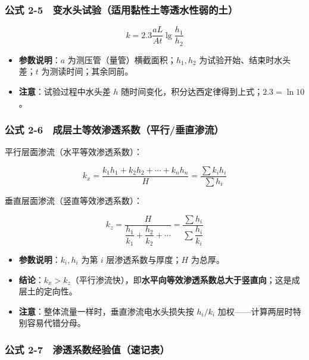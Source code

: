 \documentclass[
]{article}
\providecommand{\tightlist}{%
  \setlength{\itemsep}{0pt}\setlength{\parskip}{0pt}}
\begin{document}
\subsubsection{公式
2-5　变水头试验（适用黏性土等透水性弱的土）}\label{ux516cux5f0f-2-5-ux53d8ux6c34ux5934ux8bd5ux9a8cux9002ux7528ux9ecfux6027ux571fux7b49ux900fux6c34ux6027ux5f31ux7684ux571f}

\[k=2.3\frac{aL}{At}\lg\frac{h_1}{h_2}\]

\begin{itemize}
\tightlist
\item
  \textbf{参数说明}：\(a\) 为测压管（量管）横截面积；\(h_1,h_2\)
  为试验开始、结束时水头差；\(t\) 为测读时间；其余同前。
\item
  \textbf{注意}：试验过程中水头差 \(h\)
  随时间变化，积分达西定律得到上式；\(2.3=\ln10\)。
\end{itemize}

\subsubsection{公式
2-6　成层土等效渗透系数（平行/垂直渗流）}\label{ux516cux5f0f-2-6-ux6210ux5c42ux571fux7b49ux6548ux6e17ux900fux7cfbux6570ux5e73ux884cux5782ux76f4ux6e17ux6d41}

平行层面渗流（水平等效渗透系数）：

\[k_{x}=\frac{k_1h_1+k_2h_2+\cdots+k_nh_n}{H}=\frac{\sum k_i h_i}{\sum h_i}\]

垂直层面渗流（竖直等效渗透系数）：

\[k_{z}=\frac{H}{\dfrac{h_1}{k_1}+\dfrac{h_2}{k_2}+\cdots}=\frac{\sum h_i}{\sum \dfrac{h_i}{k_i}}\]

\begin{itemize}
\tightlist
\item
  \textbf{参数说明}：\(k_i,h_i\) 为第 \(i\) 层渗透系数与厚度；\(H\)
  为总厚。
\item
  \textbf{结论}：\(k_x>k_z\)（平行渗流快），即\textbf{水平向等效渗透系数总大于竖直向}；这是成层土的定向性。
\item
  \textbf{注意}：整体流量一样时，垂直渗流电水头损失按 \(h_i/k_i\)
  加权------计算两层时特别容易代错分母。
\end{itemize}

\subsubsection{公式
2-7　渗透系数经验值（速记表）}\label{ux516cux5f0f-2-7-ux6e17ux900fux7cfbux6570ux7ecfux9a8cux503cux901fux8bb0ux8868}
\end{document}
